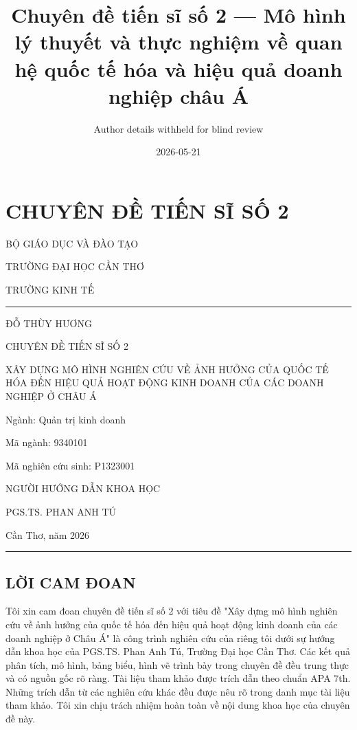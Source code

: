 \documentclass[12pt,a4paper]{article}
\title{Chuyên đề tiến sĩ số 2 --- Mô hình lý thuyết và thực nghiệm về
quan hệ quốc tế hóa và hiệu quả doanh nghiệp châu Á}
\author{Author details withheld for blind review}
\date{2026-05-21}
\begin{document}
\maketitle

\hypertarget{chuyuxean-ux111ux1ec1-tiux1ebfn-sux129-sux1ed1-2}{%
\section{CHUYÊN ĐỀ TIẾN SĨ SỐ
2}\label{chuyuxean-ux111ux1ec1-tiux1ebfn-sux129-sux1ed1-2}}

BỘ GIÁO DỤC VÀ ĐÀO TẠO

TRƯỜNG ĐẠI HỌC CẦN THƠ

TRƯỜNG KINH TẾ

\begin{center}\rule{0.5\linewidth}{0.5pt}\end{center}

ĐỖ THÙY HƯƠNG

CHUYÊN ĐỀ TIẾN SĨ SỐ 2

XÂY DỰNG MÔ HÌNH NGHIÊN CỨU VỀ ẢNH HƯỞNG CỦA QUỐC TẾ HÓA ĐẾN HIỆU QUẢ
HOẠT ĐỘNG KINH DOANH CỦA CÁC DOANH NGHIỆP Ở CHÂU Á

Ngành: Quản trị kinh doanh

Mã ngành: 9340101

Mã nghiên cứu sinh: P1323001

NGƯỜI HƯỚNG DẪN KHOA HỌC

PGS.TS. PHAN ANH TÚ

Cần Thơ, năm 2026

\begin{center}\rule{0.5\linewidth}{0.5pt}\end{center}

\hypertarget{lux1eddi-cam-ux111oan}{%
\subsection{LỜI CAM ĐOAN}\label{lux1eddi-cam-ux111oan}}

Tôi xin cam đoan chuyên đề tiến sĩ số 2 với tiêu đề "Xây dựng mô hình
nghiên cứu về ảnh hưởng của quốc tế hóa đến hiệu quả hoạt động kinh
doanh của các doanh nghiệp ở Châu Á" là công trình nghiên cứu của riêng
tôi dưới sự hướng dẫn khoa học của PGS.TS. Phan Anh Tú, Trường Đại học
Cần Thơ. Các kết quả phân tích, mô hình, bảng biểu, hình vẽ trình bày
trong chuyên đề đều trung thực và có nguồn gốc rõ ràng. Tài liệu tham
khảo được trích dẫn theo chuẩn APA 7th. Những trích dẫn từ các nghiên
cứu khác đều được nêu rõ trong danh mục tài liệu tham khảo. Tôi xin chịu
trách nhiệm hoàn toàn về nội dung khoa học của chuyên đề này.
\end{document}
